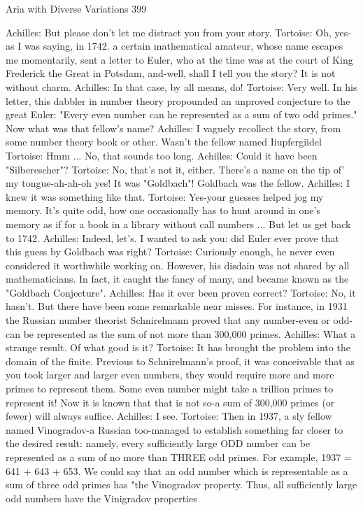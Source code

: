 Aria with Diverse Variations                                                           399

Achilles: But please don't let me distract you from your story.
Tortoise: Oh, yes-as I was saying, in 1742. a certain mathematical amateur, whose name
    escapes me momentarily, sent a letter to Euler, who at the time was at the court of
    King Frederick the Great in Potsdam, and-well, shall I tell you the story? It is not
    without charm. Achilles: In that case, by all means, do!
Tortoise: Very well. In his letter, this dabbler in number theory propounded an unproved
    conjecture to the great Euler: "Every even number can he represented as a sum of
    two odd primes." Now what was that fellow's name?
Achilles: I vaguely recollect the story, from some number theory book or other. Wasn't
    the fellow named Iiupfergiidel
Tortoise: Hmm ... No, that sounds too long.
Achilles: Could it have been "Silberescher"?
Tortoise: No, that's not it, either. There's a name on the tip of' my tongue-ah-ah-oh yes! It
    was "Goldbach"! Goldbach was the fellow. Achilles: I knew it was something like
    that.
Tortoise: Yes-your guesses helped jog my memory. It's quite odd, how one occasionally
    has to hunt around in one's memory as if for a book in a library without call numbers
    ... But let us get back to 1742.
Achilles: Indeed, let's. I wanted to ask you: did Euler ever prove that this guess by
    Goldbach was right?
Tortoise: Curiously enough, he never even considered it worthwhile working on.
    However, his disdain was not shared by all mathematicians. In fact, it caught the
    fancy of many, and became known as the "Goldbach Conjecture".
Achilles: Has it ever been proven correct?
Tortoise: No, it hasn't. But there have been some remarkable near misses. For instance, in
    1931 the Russian number theorist Schnirelmann proved that any number-even or
    odd-can be represented as the sum of not more than 300,000 primes.
Achilles: What a strange result. Of what good is it?
Tortoise: It has brought the problem into the domain of the finite. Previous to
    Schnirelmann's proof, it was conceivable that as you took larger and larger even
    numbers, they would require more and more primes to represent them. Some even
    number might take a trillion primes to represent it! Now it is known that that is not
    so-a sum of 300,000 primes (or fewer) will always suffice.
Achilles: I see.
Tortoise: Then in 1937, a sly fellow named Vinogradov-a Russian too-managed to
    establish something far closer to the desired result: namely, every sufficiently large
    ODD number can be represented as a sum of no more than THREE odd primes. For
    example, 1937 = 641 + 643 + 653. We could say that an odd number which is
    representable as a sum of three odd primes has "the Vinogradov property. Thus, all
    sufficiently large odd numbers have the Vinigradov properties




